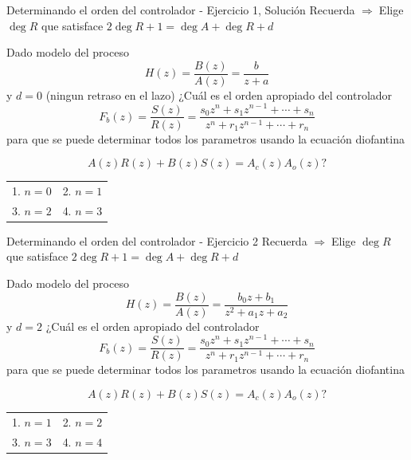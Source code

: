 \documentclass[presentation,aspectratio=169]{beamer}
\begin{document}
\begin{frame}[label={sec:org1b77aa0}]{Determinando el orden del controlador - Ejercicio 1, Solución}
Recuerda    \alert{\(\Rightarrow\;\)Elige \(\deg R\) que satisface \(2\deg R + 1 = \deg A + \deg R + d\)}

   Dado modelo del proceso \[H(z) = \frac{B(z)}{A(z)} = \frac{b}{z + a}\] y \(d=0\) (ningun retraso en el lazo) ¿Cuál es el orden apropiado del controlador 
\[F_b(z) = \frac{S(z)}{R(z)} = \frac{s_0z^n + s_1z^{n-1} + \cdots + s_n}{z^n + r_1 z^{n-1} + \cdots + r_n}\]
para que se puede determinar todos los parametros usando la ecuación diofantina

\[ A(z)R(z) + B(z)S(z) = A_c(z)A_o(z)?\]
\begin{center}
\begin{tabular}{ll}
1. \(n = 0\) & 2. \(n = 1\)\\
3. \(n=2\) & 4. \(n=3\)\\
\end{tabular}
\end{center}
\end{frame}

\begin{frame}[label={sec:org3ee95c1}]{Determinando el orden del controlador - Ejercicio 2}
Recuerda    \alert{\(\Rightarrow\;\)Elige \(\deg R\) que satisface \(2\deg R + 1 = \deg A + \deg R + d\)}

   Dado modelo del proceso \[H(z) = \frac{B(z)}{A(z)} = \frac{b_0z + b_1}{z^2 + a_1z + a_2}\] y \(d=2\)  ¿Cuál es el orden apropiado del controlador 
\[F_b(z) = \frac{S(z)}{R(z)} = \frac{s_0z^n + s_1z^{n-1} + \cdots + s_n}{z^n + r_1 z^{n-1} + \cdots + r_n}\]
para que se puede determinar todos los parametros usando la ecuación diofantina

\[ A(z)R(z) + B(z)S(z) = A_c(z)A_o(z)?\]

\begin{center}
\begin{tabular}{ll}
1. \(n = 1\) & 2. \(n = 2\)\\
3. \(n=3\) & 4. \(n=4\)\\
\end{tabular}
\end{center}
\end{frame}
\end{document}
